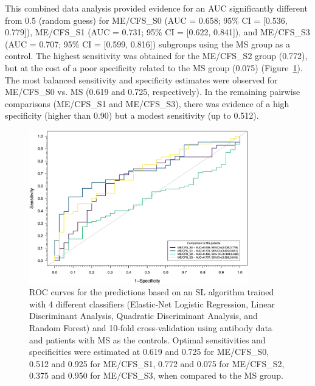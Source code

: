 This combined data analysis provided evidence for an AUC significantly different from 0.5 (random guess) for ME/CFS\_S0 (AUC = 0.658; 95\% CI = [0.536, 0.779]), ME/CFS\_S1 (AUC = 0.731; 95\% CI = [0.622, 0.841]), and ME/CFS\_S3 (AUC = 0.707; 95\% CI = [0.599, 0.816]) subgroups using the MS group as a control. The highest sensitivity was obtained for the ME/CFS\_S2 group (0.772), but at the cost of a poor specificity related to the MS group (0.075) (Figure~\ref{fig:fig3-roc-curves-sl-algorithm}). The most balanced sensitivity and specificity estimates were observed for ME/CFS\_S0 vs. MS (0.619 and 0.725, respectively). In the remaining pairwise comparisons (ME/CFS\_S1 and ME/CFS\_S3), there was evidence of a high specificity (higher than 0.90) but a modest sensitivity (up to 0.512).

\clearpage

\begin{figure}[ht]
    \centering
    \includegraphics[width=0.85\textwidth]{chapter/2023-sym-and-herpesvirus/figures/fig3-roc-curves-sl-algorithm.jpg}
    \caption[ROC curves for the predictions based on an SL algorithm trained with 4 different classifiers and 10-fold cross-validation using antibody data and patients with MS as the controls]{ROC curves for the predictions based on an SL algorithm trained with 4 different classifiers (Elastic-Net Logistic Regression, Linear Discriminant Analysis, Quadratic Discriminant Analysis, and Random Forest) and 10-fold cross-validation using antibody data and patients with MS as the controls. Optimal sensitivities and specificities were estimated at 0.619 and 0.725 for ME/CFS\_S0, 0.512 and 0.925 for ME/CFS\_S1, 0.772 and 0.075 for ME/CFS\_S2, 0.375 and 0.950 for ME/CFS\_S3, when compared to the MS group.}
    \label{fig:fig3-roc-curves-sl-algorithm}
\end{figure}

